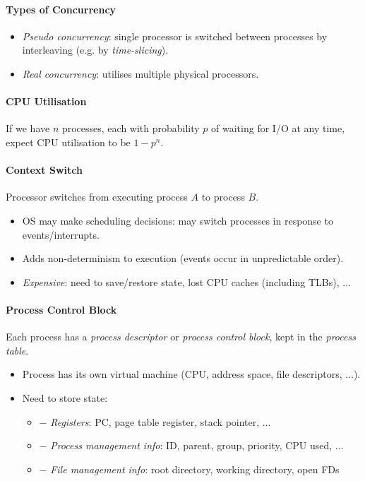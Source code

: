\documentclass[twocolumn,english]{article}
\begin{document}
\paragraph{Types of Concurrency}
\begin{itemize}
\item \emph{Pseudo concurrency}: single processor is switched between processes
by interleaving (e.g. by \emph{time-slicing}).
\item \emph{Real concurrency}: utilises multiple physical processors.
\end{itemize}

\paragraph{CPU Utilisation}

If we have $n$ processes, each with probability $p$ of waiting for
I/O at any time, expect CPU utilisation to be $1-p^{n}$.

\paragraph{Context Switch}

Processor switches from executing process $A$ to process $B$.
\begin{itemize}
\item OS may make scheduling decisions: may switch processes in response
to events/interrupts.
\item Adds non-determinism to execution (events occur in unpredictable order).
\item \emph{Expensive}: need to save/restore state, lost CPU caches (including
TLBs), ...
\end{itemize}

\paragraph{Process Control Block}

Each process has a \emph{process descriptor} or \emph{process control
block}, kept in the \emph{process table}.
\begin{itemize}
\item Process has its own virtual machine (CPU, address space, file descriptors,
...).
\item Need to store state:
\begin{itemize}
\item $-$ \emph{Registers}: PC, page table register, stack pointer, ...
\item $-$ \emph{Process management info}: ID, parent, group, priority,
CPU used, ...
\item $-$ \emph{File management info}: root directory, working directory,
open FDs
\end{itemize}
\end{itemize}
\end{document}
